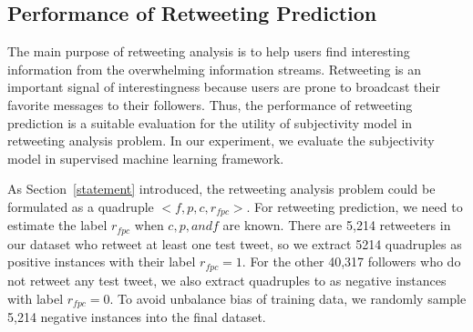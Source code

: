 \documentclass[smallcondensed]{svjour3}     %
\begin{document}
\subsection{Performance of Retweeting Prediction}
\label{performance}
The main purpose of retweeting analysis is to help users find interesting information from the overwhelming information streams. 
Retweeting is an important signal of interestingness because users are prone to broadcast their favorite messages to their followers. 
Thus, the performance of retweeting prediction is a suitable evaluation for the utility of subjectivity model  in retweeting analysis problem.
In our experiment, we evaluate the subjectivity model  in supervised machine learning framework.

As Section~\ref{statement} introduced, the retweeting analysis problem could be formulated as a quadruple $< f, p, c, r_{fpc} > $.
For retweeting prediction, we need to estimate the label $ r_{fpc} $ when $ c, p, and  f $ are known. 
There are 5,214 retweeters in our dataset who retweet at least one test tweet, so we extract 5214 quadruples as positive instances with their label $ r_{fpc}=1 $.
For the other 40,317 followers who do not retweet any test tweet, we also extract quadruples to as negative instances with label $ r_{fpc}=0 $.
To avoid unbalance bias of training data, we randomly sample 5,214 negative instances into the final dataset.
\end{document}
